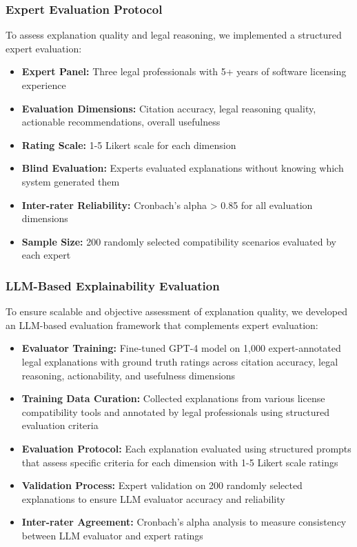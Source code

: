 \subsubsection{Expert Evaluation Protocol}
To assess explanation quality and legal reasoning, we implemented a structured expert evaluation:

\begin{itemize}
    \item \textbf{Expert Panel:} Three legal professionals with 5+ years of software licensing experience
    \item \textbf{Evaluation Dimensions:} Citation accuracy, legal reasoning quality, actionable recommendations, overall usefulness
    \item \textbf{Rating Scale:} 1-5 Likert scale for each dimension
    \item \textbf{Blind Evaluation:} Experts evaluated explanations without knowing which system generated them
    \item \textbf{Inter-rater Reliability:} Cronbach's alpha > 0.85 for all evaluation dimensions
    \item \textbf{Sample Size:} 200 randomly selected compatibility scenarios evaluated by each expert
\end{itemize}

\subsubsection{LLM-Based Explainability Evaluation}
To ensure scalable and objective assessment of explanation quality, we developed an LLM-based evaluation framework that complements expert evaluation:

\begin{itemize}
    \item \textbf{Evaluator Training:} Fine-tuned GPT-4 model on 1,000 expert-annotated legal explanations with ground truth ratings across citation accuracy, legal reasoning, actionability, and usefulness dimensions
    \item \textbf{Training Data Curation:} Collected explanations from various license compatibility tools and annotated by legal professionals using structured evaluation criteria
    \item \textbf{Evaluation Protocol:} Each explanation evaluated using structured prompts that assess specific criteria for each dimension with 1-5 Likert scale ratings
    \item \textbf{Validation Process:} Expert validation on 200 randomly selected explanations to ensure LLM evaluator accuracy and reliability
    \item \textbf{Inter-rater Agreement:} Cronbach's alpha analysis to measure consistency between LLM evaluator and expert ratings
\end{itemize}


